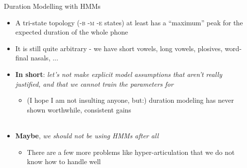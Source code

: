 \begin{frame}{Duration Modelling with HMMs}
  \begin{itemize}
  \item A tri-state topology (\textsc{-b -m -e} states) at least has a ``maximum'' peak for
    the expected duration of the whole phone
  \item It is still quite arbitrary - we have short vowels, long vowels, plosives, word-final nasals, ...\\
    \hspace{1cm}
  \item \textbf{In short}: \textit{let's not make explicit model assumptions
    that aren't really justified, and that we cannot train the parameters for}
    \begin{itemize}
    \item (I hope I am not insulting anyone, but:) duration modeling has never shown
      worthwhile, consistent gains\\
      \hspace{1cm}\\
      \hspace{1cm}
    \end{itemize}
  \item \textbf{Maybe}, \textit{we should not be using HMMs after all}
    \begin{itemize}
    \item There are a few more problems like hyper-articulation that we do not know how to handle well
    \end{itemize}
  \end{itemize}
\end{frame}



